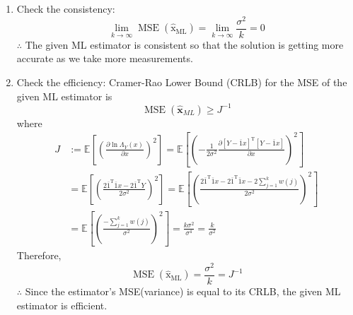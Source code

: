 \documentclass[10pt,a4paper,oneside]{article}
\begin{document}
\begin{enumerate}
\item Check the consistency:
\[
\lim _{k \rightarrow \infty} \operatorname{MSE}\left(\hat{\mathrm{x}}_{\mathrm{ML}}\right)=\lim _{k \rightarrow \infty} \frac{\sigma^{2}}{k}=0
\]
$\therefore$ The given ML estimator is consistent so that the solution is getting more accurate as we
take more measurements.
\item Check the efficiency: Cramer-Rao Lower Bound (CRLB) for the MSE of the given ML estimator
is
\[
\operatorname{MSE}\left(\hat{\mathbf{x}}_{M L}\right) \geq J^{-1}
\]
where
\[
\begin{aligned} J & :=\mathbb{E}\left[\left(\frac{\partial \ln \Lambda_{Y}(x)}{\partial x}\right)^{2}\right]=\mathbb{E}\left[\left(-\frac{1}{2 \sigma^{2}} \frac{\partial[Y-\overline{1} x]^{\mathrm{T}}[Y-\overline{1} x]}{\partial x}\right)^{2}\right] \\ &=\mathbb{E}\left[\left(\frac{2 \overline{1}^{\mathrm{T}} \overline{1} x-2 \overline{1}^{\mathrm{T}} Y}{2 \sigma^{2}}\right)^{2}\right]=\mathbb{E}\left[\left(\frac{2 \overline{1}^{\mathrm{T}} \overline{1} x-2 \overline{1}^{\mathrm{T}} \overline{1} x-2 \sum_{j=1}^{k} w(j)}{2 \sigma^{2}}\right)^{2}\right] \\ &=\mathbb{E}\left[\left(\frac{-\sum_{j=1}^{k} w(j)}{\sigma^{2}}\right)^{2}\right]=\frac{k \sigma^{2}}{\sigma^{4}}=\frac{k}{\sigma^{2}} \end{aligned}
\]
Therefore,
\[
\operatorname{MSE}\left(\hat{\mathrm{x}}_{\mathrm{ML}}\right)=\frac{\sigma^{2}}{k}=J^{-1}
\]
$\therefore$ Since the estimator's MSE(variance) is equal to its CRLB, the given ML estimator is efficient.
\end{enumerate}
\end{document}
